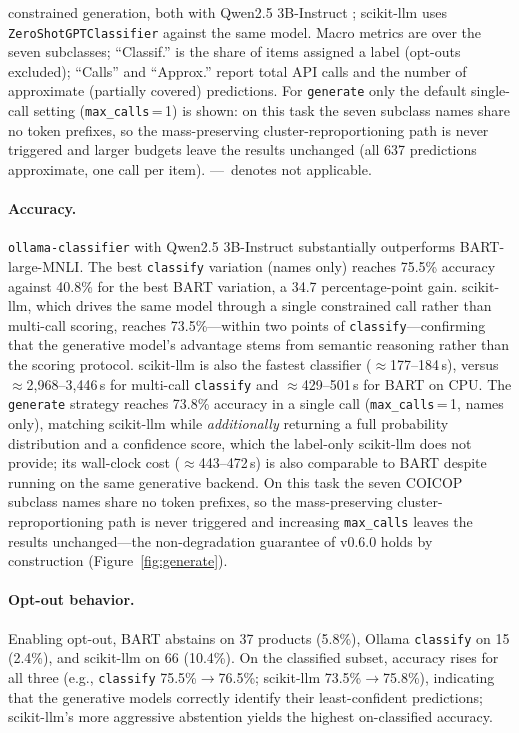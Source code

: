 \documentclass[11pt,a4paper]{article}
\providecommand{\dm}{---}
\begin{document}
\begin{table}[htbp]
{    constrained generation, both with Qwen2.5 3B-Instruct
    \citep{yang2024qwen2}; scikit-llm \citep{ScikitLLM} uses
    \texttt{ZeroShotGPTClassifier} against the same model. Macro
    metrics are over the seven subclasses; ``Classif.'' is the share
    of items assigned a label (opt-outs excluded); ``Calls'' and
    ``Approx.'' report total API calls and the number of approximate
    (partially covered) predictions. For \texttt{generate} only the
    default single-call setting (\texttt{max\_calls}\,=\,1) is shown:
    on this task the seven subclass names share no token prefixes, so
    the mass-preserving cluster-reproportioning path is never triggered
    and larger budgets leave the results unchanged (all 637 predictions
    approximate, one call per item). \dm\ denotes not applicable.
  }
\end{table}

\paragraph{Accuracy.}
\texttt{ollama-classifier} with Qwen2.5 3B-Instruct substantially outperforms
BART-large-MNLI. The best \texttt{classify} variation (names only) reaches
75.5\% accuracy against 40.8\% for the best BART variation, a 34.7
percentage-point gain. scikit-llm, which drives the same model through a
single constrained call rather than multi-call scoring, reaches 73.5\%---within
two points of \texttt{classify}---confirming that the generative model's
advantage stems from semantic reasoning rather than the scoring protocol.
scikit-llm is also the fastest classifier ($\approx$177--184\,s), versus
$\approx$2{,}968--3{,}446\,s for multi-call \texttt{classify} and
$\approx$429--501\,s for BART on CPU. The \texttt{generate} strategy reaches
73.8\% accuracy in a single call (\texttt{max\_calls}\,=\,1, names only),
matching scikit-llm while \emph{additionally} returning a full probability
distribution and a confidence score, which the label-only scikit-llm does not
provide; its wall-clock cost ($\approx$443--472\,s) is also comparable to BART
despite running on the same generative backend. On this task the seven COICOP
subclass names share no token prefixes, so the mass-preserving
cluster-reproportioning path is never triggered and increasing
\texttt{max\_calls} leaves the results unchanged---the
non-degradation guarantee of v0.6.0 holds by construction
(Figure~\ref{fig:generate}).

\paragraph{Opt-out behavior.}
Enabling opt-out, BART abstains on 37 products (5.8\%), Ollama
\texttt{classify} on 15 (2.4\%), and scikit-llm on 66 (10.4\%). On the
classified subset, accuracy rises for all three (e.g.,
\texttt{classify} 75.5\%$\to$76.5\%; scikit-llm 73.5\%$\to$75.8\%),
indicating that the generative models correctly identify their least-confident
predictions; scikit-llm's more aggressive abstention yields the highest
on-classified accuracy.
\end{document}
